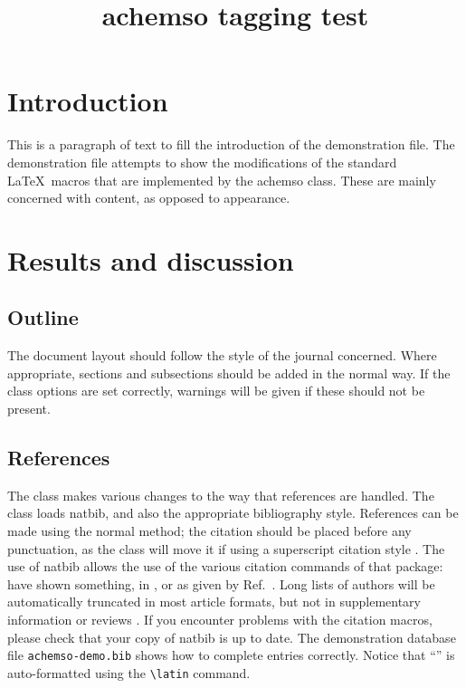 \title{achemso tagging test}




\section{Introduction}
This is a paragraph of text to fill the introduction of the
demonstration file.  The demonstration file attempts to show the
modifications of the standard \LaTeX\ macros that are implemented by
the \textsf{achemso} class.  These are mainly concerned with content,
as opposed to appearance.

\section{Results and discussion}

\subsection{Outline}

The document layout should follow the style of the journal concerned.
Where appropriate, sections and subsections should be added in the
normal way. If the class options are set correctly, warnings will be
given if these should not be present.

\subsection{References}

The class makes various changes to the way that references are
handled.  The class loads \textsf{natbib}, and also the
appropriate bibliography style.  References can be made using
the normal method; the citation should be placed before any
punctuation, as the class will move it if using a superscript
citation style
\cite{Mena2000,Abernethy2003,Friedman-Hill2003,EuropeanCommission2008}.
The use of \textsf{natbib} allows the use of the various citation
commands of that package: \citeauthor{Abernethy2003} have shown
something, in \citeyear{Cotton1999}, or as given by
Ref.~.  Long lists of authors will be
automatically truncated in most article formats, but not in
supplementary information or reviews \cite{Pople2003}. If you
encounter problems with the citation macros, please check that
your copy of \textsf{natbib} is up to date. The demonstration
database file \texttt{achemso-demo.bib} shows how to complete
entries correctly. Notice that ``'' is auto-formatted
using the \texttt{\textbackslash latin} command.

